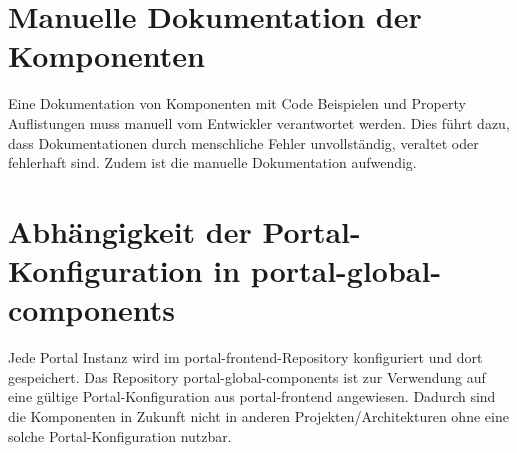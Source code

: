 \section{Manuelle Dokumentation der Komponenten}
\label{sec:manualDocumentation}
Eine Dokumentation von Komponenten mit Code Beispielen und Property Auflistungen muss manuell vom Entwickler verantwortet werden. Dies führt dazu, dass Dokumentationen durch menschliche Fehler unvollständig, veraltet oder fehlerhaft sind. Zudem ist die manuelle Dokumentation aufwendig.
 
\section{Abhängigkeit der Portal-Konfiguration in portal-global-components}
\label{sec:portalConfigDep}
Jede Portal Instanz wird im portal-frontend-Repository konfiguriert und dort  gespeichert. Das Repository portal-global-components ist zur Verwendung auf eine gültige Portal-Konfiguration aus portal-frontend angewiesen. Dadurch sind die Komponenten in Zukunft nicht in anderen Projekten/Architekturen ohne eine solche Portal-Konfiguration nutzbar.
